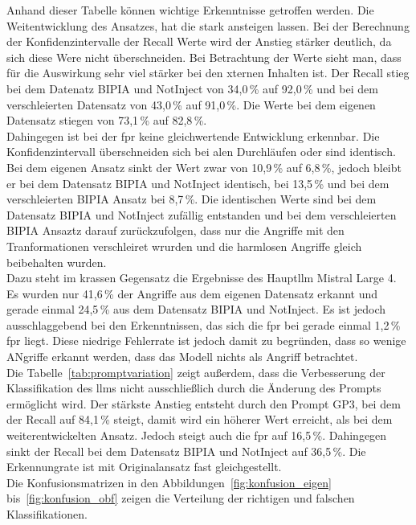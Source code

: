 Anhand dieser Tabelle können wichtige Erkenntnisse getroffen werden. Die Weitentwicklung des Ansatzes, hat die stark ansteigen lassen. Bei der Berechnung der
Konfidenzintervalle der Recall Werte wird der Anstieg stärker deutlich, da sich diese Were nicht überschneiden. Bei Betrachtung der Werte sieht man, dass für die 
Auswirkung sehr viel stärker bei den xternen Inhalten ist. Der Recall stieg bei dem Datenatz BIPIA und NotInject von 34,0\,\% auf 92,0\,\% und bei dem 
verschleierten Datensatz von 43,0\,\% auf 91,0\,\%. Die Werte bei dem eigenen Datensatz stiegen von 73,1\,\% auf 82,8\,\%. \\
Dahingegen ist bei der \ac{fpr} keine gleichwertende Entwicklung erkennbar. Die Konfidenzintervall überschneiden sich bei alen Durchläufen oder sind identisch.
Bei dem eigenen Ansatz sinkt der Wert zwar  von 10,9\,\% auf 6,8\,\%, jedoch bleibt er bei dem Datensatz BIPIA und NotInject identisch, bei 13,5\,\% und bei
dem verschleierten BIPIA Ansatz bei 8,7\,\%. Die identischen Werte sind bei dem Datensatz BIPIA und NotInject zufällig entstanden und bei dem verschleierten
BIPIA Ansaztz darauf zurückzufolgen, dass nur die Angriffe mit den Tranformationen verschleiret wrurden und die harmlosen Angriffe gleich beibehalten wurden. \\
Dazu steht im krassen Gegensatz die Ergebnisse des Haupt\ac{llm} Mistral Large 4. Es wurden nur 41,6\,\% der Angriffe aus dem eigenen Datensatz erkannt und gerade
einmal 24,5\,\% aus dem Datensatz BIPIA und NotInject. Es ist jedoch ausschlaggebend bei den Erkenntnissen, das sich die \ac{fpr} bei gerade einmal 1,2\,\% \ac{fpr}
liegt. Diese niedrige Fehlerrate ist jedoch damit zu begründen, dass so wenige ANgriffe erkannt werden, dass das Modell nichts als Angriff betrachtet. \\
Die Tabelle~\ref{tab:promptvariation} zeigt außerdem, dass die Verbesserung der Klassifikation des \acp{llm} nicht ausschließlich durch die Änderung des Prompts
ermöglicht wird. Der stärkste Anstieg entsteht durch den Prompt GP3, bei dem der Recall auf 84,1\,\% steigt, damit wird ein höherer Wert erreicht, als bei dem 
weiterentwickelten Ansatz. Jedoch steigt auch die \ac{fpr} auf 16,5\,\%. Dahingegen sinkt der Recall bei dem Datensatz BIPIA und NotInject auf 36,5\,\%. Die 
Erkennungrate ist mit Originalansatz fast gleichgestellt. \\
Die Konfusionsmatrizen in den Abbildungen~\ref{fig:konfusion_eigen} bis~\ref{fig:konfusion_obf} zeigen die Verteilung der richtigen und falschen Klassifikationen.

